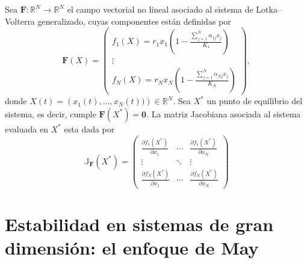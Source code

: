 \begin{definición}\label{def:LKVectorial}
	Sea $\mathbf{F}:\mathbb{R}^N\to\mathbb{R}^N$ el campo vectorial no lineal asociado al sistema de Lotka--Volterra generalizado, cuyas componentes están definidas por 
	\begin{equation}\label{eqn:Fmatricial}
		\mathbf{F}(X)=\begin{pmatrix}
			f_1(X)=r_1x_1\left(1-\frac{\sum_{j=1}^N \alpha_{1j}x_j}{K_1}\right)\\
			\vdots\\
			f_N(X)=r_Nx_N\left(1-\frac{\sum_{j=1}^N \alpha_{Nj}x_j}{K_N}\right)
		\end{pmatrix},
	\end{equation}
	donde $X(t)=\left(x_1(t),\dots,x_N(t))\right)\in\mathbb{R}^N$. Sea $X^*$ un punto de equilibrio del sistema, es decir, cumple $\mathbf{F}(X^*)=\mathbf{0}$. La matriz Jacobiana asociada al sistema evaluada en $X^*$ esta dada por
	\begin{equation}\label{eqn:Jacobiano}
		\mathbb{J}_\mathbf{F}(X^*) = \begin{pmatrix}
			\frac{\partial f_1(X^*)}{\partial x_1} & \cdots &\frac{\partial f_1(X^*)}{\partial x_N}\\
			\vdots & \ddots & \vdots\\
			\frac{\partial f_N(X^*)}{\partial x_1} & \cdots &\frac{\partial f_N(X^*)}{\partial x_N}
		\end{pmatrix}
	\end{equation}
\end{definición}


\section{Estabilidad en sistemas de gran dimensión: el enfoque de May}

